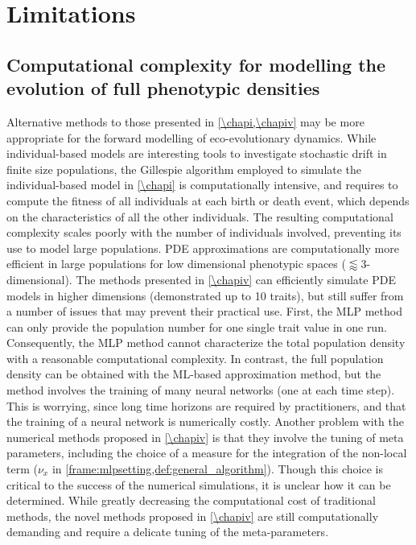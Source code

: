 \section{Limitations}
\label{sec:limitations}
\subsection{Computational complexity for modelling the evolution of full phenotypic densities}
Alternative methods to those presented in \cref{\chapi,\chapiv} may be more appropriate for the forward modelling of eco-evolutionary dynamics.
% 
While individual-based models are interesting tools to investigate stochastic drift in finite size populations, the Gillespie algorithm \citep{Gillespie1976} employed to simulate the individual-based model in \cref{\chapi} is computationally intensive, and requires to compute the fitness of all individuals at each birth or death event, which depends on the characteristics of all the other individuals. The resulting computational complexity scales poorly with the number of individuals involved, preventing its use to model large populations. 
% 
PDE approximations are computationally more efficient in large populations for low dimensional phenotypic spaces ($\lessapprox 3$-dimensional). 
% 
% 
The methods presented in \cref{\chapiv} can efficiently simulate PDE models in higher dimensions (demonstrated up to 10 traits), but still suffer from a number of issues that may prevent their practical use.
% 
First, the MLP method can only provide the population number for one single trait value in one run. Consequently, the MLP method cannot characterize the total population density with a reasonable computational complexity. 
% 
In contrast, the full population density can be obtained with the ML-based approximation method, but the method involves the training of many neural networks (one at each time step). This is worrying, since long time horizons are required by practitioners, and that the training of a neural network is numerically costly. Another problem with the numerical methods proposed in \cref{\chapiv} is that they involve the tuning of meta parameters, including the choice of a measure for the integration of the non-local term ($\nu_x$ in \cref{frame:mlpsetting,def:general_algorithm}). Though this choice is critical to the success of the numerical simulations, it is unclear how it can be determined.
% 
While greatly decreasing the computational cost of traditional methods, the novel methods proposed in \cref{\chapiv} are still computationally demanding and require a delicate tuning of the meta-parameters. 

